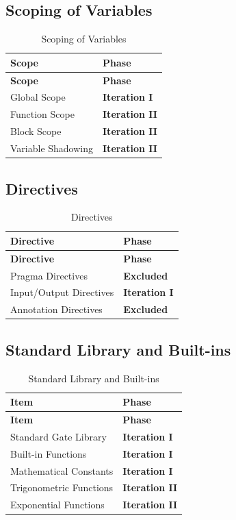 \subsection{Scoping of Variables}
\begin{longtable}{@{}p{10cm}l@{}}
\caption{Scoping of Variables}\label{tab:scoping}\\
\toprule
\textbf{Scope} & \textbf{Phase} \\
\midrule
\endfirsthead
\toprule
\textbf{Scope} & \textbf{Phase} \\
\midrule
\endhead
Global Scope & \textbf{Iteration I} \\
Function Scope & \textbf{Iteration II} \\
Block Scope & \textbf{Iteration II} \\
Variable Shadowing & \textbf{Iteration II} \\
\bottomrule
\end{longtable}

\subsection{Directives}
\begin{longtable}{@{}p{10cm}l@{}}
\caption{Directives}\label{tab:directives}\\
\toprule
\textbf{Directive} & \textbf{Phase} \\
\midrule
\endfirsthead
\toprule
\textbf{Directive} & \textbf{Phase} \\
\midrule
\endhead
Pragma Directives & \textbf{Excluded} \\
Input/Output Directives & \textbf{Iteration I} \\
Annotation Directives & \textbf{Excluded} \\
\bottomrule
\end{longtable}

\subsection{Standard Library and Built-ins}
\begin{longtable}{@{}p{10cm}l@{}}
\caption{Standard Library and Built-ins}\label{tab:stdlib}\\
\toprule
\textbf{Item} & \textbf{Phase} \\
\midrule
\endfirsthead
\toprule
\textbf{Item} & \textbf{Phase} \\
\midrule
\endhead
Standard Gate Library & \textbf{Iteration I} \\
Built-in Functions & \textbf{Iteration I} \\
Mathematical Constants & \textbf{Iteration I} \\
Trigonometric Functions & \textbf{Iteration II} \\
Exponential Functions & \textbf{Iteration II} \\
\bottomrule
\end{longtable}

